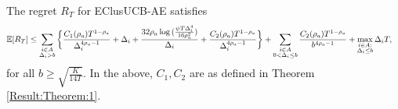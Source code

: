 \begin{proposition}
\label{proofTheorem:Prop:1}
The regret $R_T$ for EClusUCB-AE satisfies
\begin{align*}
&\mathbb{E} [R_{T}]\leq \sum\limits_{\substack{i\in A\\\Delta_{i} > b}}\bigg\lbrace\frac{C_{1}(\rho_{a})T^{1-\rho_{a}}}{\Delta_{i}^{4\rho_{a}-1}} + \Delta_{i}+\frac{32\rho_{a}\log{(\frac{\psi  T\Delta_{i}^{4}}{16\rho_{a}^{2}})}}{\Delta_{i}}
 +  \frac{C_{2}(\rho_{a})T^{1-\rho_{a}}}{\Delta_{i}^{4\rho_{a} -1}}  \bigg \rbrace +\sum\limits_{\substack{i\in A\\0 <\Delta_{i}\leq b}}\frac{C_{2}(\rho_{a})T^{1-\rho_{a}}}{b^{4\rho_{a} -1}}  + \max_{\substack{i\in A: \\ \Delta_{i}\leq b}}\Delta_{i}T,
\end{align*}
for all $b\geq\sqrt{\frac{K}{14 T}}$. In the above, $C_1, C_2$ are as defined in Theorem \ref{Result:Theorem:1}.
\end{proposition}


